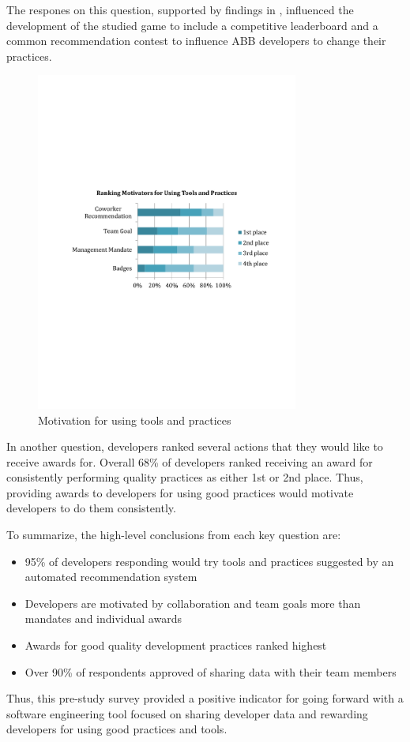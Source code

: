 \documentclass{sig-alternate}
\begin{document}
 The respones on this question, supported by findings in \cite{MurphyHill2012Improving,wbsnipes:Hill2011Peer,Dubois2013Understanding}, influenced the development of the studied game to include a competitive leaderboard and a common recommendation contest to influence ABB developers to change their practices.  
 
\begin{figure}
	\includegraphics[width=3.4in]{ToolAndPracticeMotivators.pdf}
	\caption{Motivation for using tools and practices}
	\label{fig:toolandpracticemotivators}
\end{figure}

In another question, developers ranked several actions that they would like to receive awards for.  Overall 68\% of developers ranked receiving an award for consistently performing quality practices as either 1st or 2nd place.  Thus, providing awards to developers for using good practices would motivate developers to do them consistently.

 To summarize, the high-level conclusions from each key question are:
\begin{itemize}[itemsep=0mm]
\item 95\% of developers responding would try tools and practices suggested by an automated recommendation system 
\item Developers are motivated by collaboration and team goals more than mandates and individual awards
\item Awards for good quality development practices ranked highest
\item Over 90\% of respondents approved of sharing data with their team members
\end{itemize}
Thus, this pre-study survey provided a positive indicator for going forward with a software engineering tool focused on sharing developer data and rewarding developers for using good practices and tools. 
\end{document}
